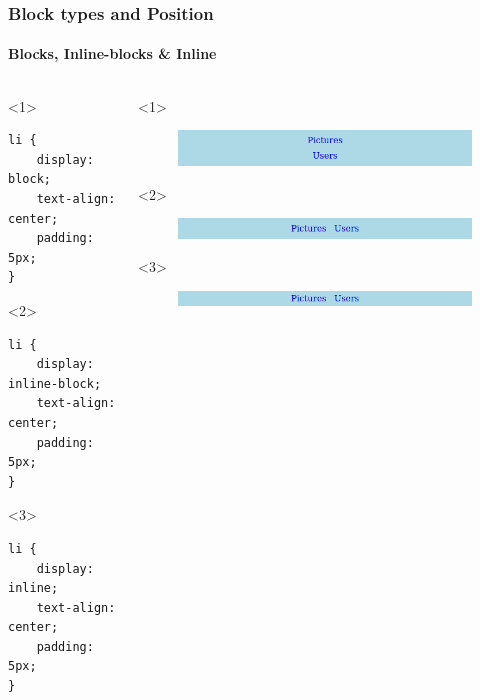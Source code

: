 \documentclass[aspectratio=169,10pt,t]{beamer}
\begin{document}
\begin{frame}[fragile]
	\frametitle{Block types and Position}
	\framesubtitle{Blocks, Inline-blocks \& Inline}

\begin{columns}
	\begin{column}{0.5\textwidth}
		\vspace{1.5cm}
\begin{onlyenv}<1>
\begin{verbatim}
li {
	display: block;
	text-align: center;
	padding: 5px;
}
\end{verbatim}
	
\end{onlyenv}
\begin{onlyenv}<2>
\begin{verbatim}
li {
	display: inline-block;
	text-align: center;
	padding: 5px;
}
\end{verbatim}
	
\end{onlyenv}
\begin{onlyenv}<3>
\begin{verbatim}
li {
	display: inline;
	text-align: center;
	padding: 5px;
}
\end{verbatim}
	
\end{onlyenv}
	\end{column}
	\begin{column}{0.5\textwidth}
		\vspace{2cm}
		\begin{onlyenv}<1>
			\begin{figure}[h]
				\centering
				\includegraphics[width=1\linewidth]{img/block.png}
			\end{figure}
		\end{onlyenv}

		\begin{onlyenv}<2>
			\begin{figure}[h]
				\centering
				\includegraphics[width=1\linewidth]{img/inline-block.png}
			\end{figure}
		\end{onlyenv}

		\begin{onlyenv}<3>
			\begin{figure}[h]
				\centering
				\includegraphics[width=1\linewidth]{img/inline.png}
			\end{figure}
		\end{onlyenv}

	\end{column}
\end{columns}

\end{frame}
\end{document}
